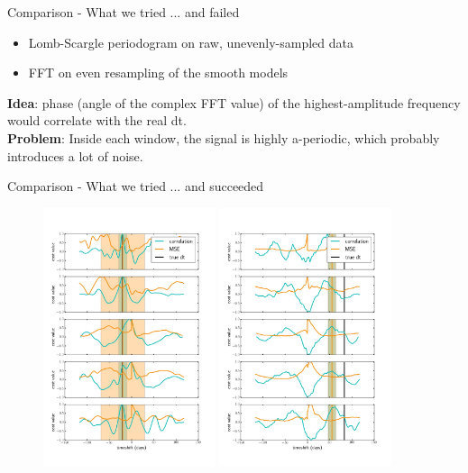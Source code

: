\documentclass[9pt]{beamer}
\begin{document}
\begin{frame}{Comparison - What we tried ... and failed}
  \begin{itemize}
    \item Lomb-Scargle periodogram on raw, unevenly-sampled data
    \item FFT on even resampling of the smooth models
  \end{itemize}
  {\bf Idea}: phase (angle of the complex FFT value) of the highest-amplitude frequency would correlate with the real dt.\\
  {\bf Problem}: Inside each window, the signal is highly a-periodic, which probably introduces a lot of noise.
\end{frame}

\begin{frame}{Comparison - What we tried ... and succeeded}
  \begin{figure}
    \includegraphics[width=0.45\textwidth]{Fig31.jpg}
    \hspace{0.05\textwidth}
    \includegraphics[width=0.45\textwidth]{Fig32.jpg}
  \end{figure}
\end{frame}
\end{document}
